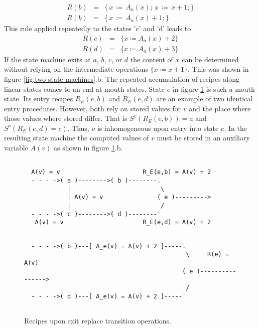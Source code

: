\documentclass[12pt,a4paper]{scrartcl}
\begin{document}
\begin{eqnarray}
    R(b)&=&\{\,x\,\coloneqq \,A_a(x);\,x\,\coloneqq \,x + 1;\} \\
    R(b)&=&\{\,x\,\coloneqq \,A_a(x) + 1; \}                                 
\end{eqnarray}
This rule applied repeatedly to the states 'c' and 'd' leads to
\begin{eqnarray}
    R(c) &=&\{ x \coloneqq  A_a(x) + 2 \} \\
    R(d) &=&\{ x \coloneqq  A_a(x) + 3 \}                                 
\end{eqnarray}
If the state machine exits at $a$, $b$, $c$, or $d$ the content of $x$ can be
determined without relying on the intermediate operations $\{ x\coloneqq x+1 \}$. This
was shown in figure \ref{fig:two-state-machines}.b. 
The repeated accumulation of recipes along linear states comes to an end at
mouth states. State $e$ in figure \ref{fig:interference-example} is such a
mouth state. Its entry recipes $R_E(e,b)$ and $R_E(e,d)$ are an example of two
identical entry procedures. However, both rely on stored values for $v$ and the
place where those values where stored differ. That is $S^v(R_E(e,b))=a$ and
$S^v(R_E(e,d)=c)$. Thus, $v$ is inhomogeneous upon entry into state $e$.  In
the resulting state machine the computed values of $v$ must be stored in an
auxiliary variable $A(v)$ as shown in figure \ref{fig:interference-example}.b.
\begin{figure}[htbp] \leavevmode \label{fig:interference-example}
\begin{verbatim}

  A(v) = v                       R_E(e,b) = A(v) + 2
  - - - ->( a )-------->( b )--------.
            |                         \
            | A(v) = v               ( e )--------->
            |                         /
  - - - ->( c )-------->( d )--------'
   A(v) = v                      R_E(e,d) = A(v) + 2

\end{verbatim}
\begin{verbatim}
                                 
  - - - ->( b )---[ A_e(v) = A(v) + 2 ]-----.
                                             \     R(e) = A(v)
                                            ( e )---------------->
                                             /
  - - - ->( d )---[ A_e(v) = A(v) + 2 ]-----'
                                 

\end{verbatim}
\caption{Recipes upon exit replace transition operations.}
\end{figure}
\end{document}
